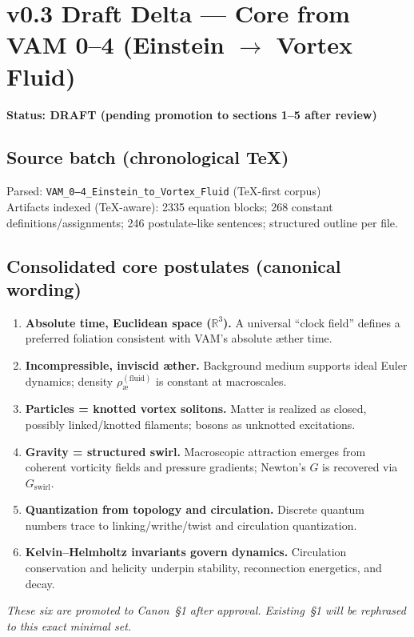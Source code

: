 \documentclass[11pt]{article}
\begin{document}
\section{v0.3 Draft Delta --- Core from VAM 0--4 (Einstein $\rightarrow$ Vortex Fluid)}
\textbf{Status: DRAFT (pending promotion to sections 1--5 after review)}

\subsection{Source batch (chronological TeX)}
Parsed: \texttt{VAM\_0--4\_Einstein\_to\_Vortex\_Fluid} (TeX-first corpus)\\
Artifacts indexed (TeX-aware): 2335 equation blocks; 268 constant definitions/assignments; 246 postulate-like sentences; structured outline per file.

\subsection{Consolidated core postulates (canonical wording)}
\begin{enumerate}
    \item \textbf{Absolute time, Euclidean space ($\mathbb{R}^3$).} A universal ``clock field'' defines a preferred foliation consistent with VAM's absolute æther time.
    \item \textbf{Incompressible, inviscid æther.} Background medium supports ideal Euler dynamics; density $\rho_{\text{\ae}}^{(\text{fluid})}$ is constant at macroscales.
    \item \textbf{Particles = knotted vortex solitons.} Matter is realized as closed, possibly linked/knotted filaments; bosons as unknotted excitations.
    \item \textbf{Gravity = structured swirl.} Macroscopic attraction emerges from coherent vorticity fields and pressure gradients; Newton's $G$ is recovered via $G_{\text{swirl}}$.
    \item \textbf{Quantization from topology and circulation.} Discrete quantum numbers trace to linking/writhe/twist and circulation quantization.
    \item \textbf{Kelvin--Helmholtz invariants govern dynamics.} Circulation conservation and helicity underpin stability, reconnection energetics, and decay.
\end{enumerate}
\textit{These six are promoted to Canon~\S1 after approval. Existing~\S1 will be rephrased to this exact minimal set.}
\end{document}
